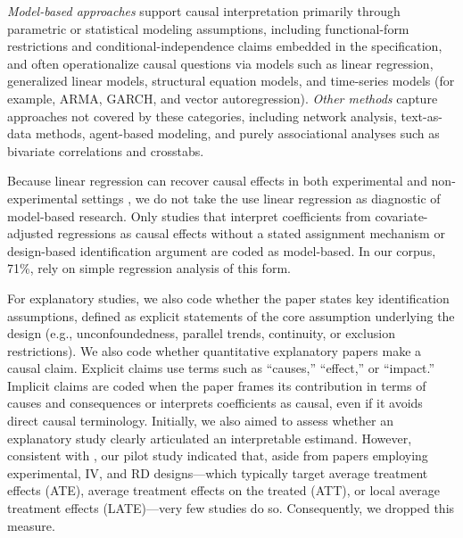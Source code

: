 \documentclass[12pt]{article}
\begin{document}
{\it Model-based approaches} support causal interpretation primarily through parametric or statistical modeling assumptions, including functional-form restrictions and conditional-independence claims embedded in the specification, and often operationalize causal questions via models such as linear regression, generalized linear models, structural equation models, and time-series models (for example, ARMA, GARCH, and vector autoregression). {\it Other methods} capture approaches not covered by these categories, including network analysis, text-as-data methods, agent-based modeling, and purely associational analyses such as bivariate correlations and crosstabs. 

Because linear regression can recover causal effects in both experimental and non-experimental settings \citep{angrist2009mostly, aronow2016does, imbens2025comparing}, we do not take the use linear regression as diagnostic of model-based research. Only studies that interpret coefficients from covariate-adjusted regressions as causal effects without a stated assignment mechanism or design-based identification argument are coded as model-based. In our corpus, 71\%, rely on simple regression analysis of this form.

For explanatory studies, we also code whether the paper states key identification assumptions, defined as explicit statements of the core assumption underlying the design (e.g., unconfoundedness, parallel trends, continuity, or exclusion restrictions). We also code whether quantitative explanatory papers make a causal claim. Explicit claims use terms such as ``causes,'' ``effect,'' or ``impact.'' Implicit claims are coded when the paper frames its contribution in terms of causes and consequences or interprets coefficients as causal, even if it avoids direct causal terminology. Initially, we also aimed to assess whether an explanatory study clearly articulated an interpretable estimand. However, consistent with \citet{lundberg2021your}, our pilot study indicated that, aside from papers employing experimental, IV, and RD designs—which typically target average treatment effects (ATE), average treatment effects on the treated (ATT), or local average treatment effects (LATE)---very few studies do so. Consequently, we dropped this measure.
\end{document}
